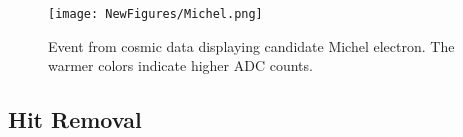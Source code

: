 \documentclass[12pt]{article}
\begin{document}
\begin{figure}[h!]
\centering
\texttt{[image: NewFigures/Michel.png]}
\caption{Event from cosmic data displaying candidate Michel electron. The warmer colors indicate higher ADC counts. } 
\label{fig:michel}
\end{figure}


\subsection{Hit Removal}
\end{document}
